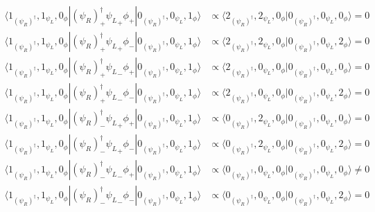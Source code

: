 \begin{align*}
 \langle1_{(\psi_R)^{\dagger}},1_{{\psi_L}},0_{\phi}|(\psi_R)^{\dagger}_{+}{\psi_L}_{+}\phi_{+}|0_{(\psi_R)^{\dagger}},0_{{\psi_L}},1_{\phi}\rangle  &\propto  \langle2_{(\psi_R)^{\dagger}},2_{{\psi_L}},0_{\phi}|0_{(\psi_R)^{\dagger}},0_{{\psi_L}},0_{\phi}\rangle =0\\ 
 \langle1_{(\psi_R)^{\dagger}},1_{{\psi_L}},0_{\phi}|(\psi_R)^{\dagger}_{+}{\psi_L}_{+}\phi_{-}|0_{(\psi_R)^{\dagger}},0_{{\psi_L}},1_{\phi}\rangle  &\propto  \langle2_{(\psi_R)^{\dagger}},2_{{\psi_L}},0_{\phi}|0_{(\psi_R)^{\dagger}},0_{{\psi_L}},2_{\phi}\rangle =0\\ 
 \langle1_{(\psi_R)^{\dagger}},1_{{\psi_L}},0_{\phi}|(\psi_R)^{\dagger}_{+}{\psi_L}_{-}\phi_{+}|0_{(\psi_R)^{\dagger}},0_{{\psi_L}},1_{\phi}\rangle  &\propto  \langle2_{(\psi_R)^{\dagger}},0_{{\psi_L}},0_{\phi}|0_{(\psi_R)^{\dagger}},0_{{\psi_L}},0_{\phi}\rangle =0\\ 
 \langle1_{(\psi_R)^{\dagger}},1_{{\psi_L}},0_{\phi}|(\psi_R)^{\dagger}_{+}{\psi_L}_{-}\phi_{-}|0_{(\psi_R)^{\dagger}},0_{{\psi_L}},1_{\phi}\rangle  &\propto  \langle2_{(\psi_R)^{\dagger}},0_{{\psi_L}},0_{\phi}|0_{(\psi_R)^{\dagger}},0_{{\psi_L}},2_{\phi}\rangle =0\\ 
 \langle1_{(\psi_R)^{\dagger}},1_{{\psi_L}},0_{\phi}|(\psi_R)^{\dagger}_{-}{\psi_L}_{+}\phi_{+}|0_{(\psi_R)^{\dagger}},0_{{\psi_L}},1_{\phi}\rangle  &\propto  \langle0_{(\psi_R)^{\dagger}},2_{{\psi_L}},0_{\phi}|0_{(\psi_R)^{\dagger}},0_{{\psi_L}},0_{\phi}\rangle =0\\ 
 \langle1_{(\psi_R)^{\dagger}},1_{{\psi_L}},0_{\phi}|(\psi_R)^{\dagger}_{-}{\psi_L}_{+}\phi_{-}|0_{(\psi_R)^{\dagger}},0_{{\psi_L}},1_{\phi}\rangle  &\propto  \langle0_{(\psi_R)^{\dagger}},2_{{\psi_L}},0_{\phi}|0_{(\psi_R)^{\dagger}},0_{{\psi_L}},2_{\phi}\rangle =0\\ 
 \langle1_{(\psi_R)^{\dagger}},1_{{\psi_L}},0_{\phi}|(\psi_R)^{\dagger}_{-}{\psi_L}_{-}\phi_{+}|0_{(\psi_R)^{\dagger}},0_{{\psi_L}},1_{\phi}\rangle  &\propto  \langle0_{(\psi_R)^{\dagger}},0_{{\psi_L}},0_{\phi}|0_{(\psi_R)^{\dagger}},0_{{\psi_L}},0_{\phi}\rangle \neq 0\\
 \langle1_{(\psi_R)^{\dagger}},1_{{\psi_L}},0_{\phi}|(\psi_R)^{\dagger}_{-}{\psi_L}_{-}\phi_{-}|0_{(\psi_R)^{\dagger}},0_{{\psi_L}},1_{\phi}\rangle  &\propto  \langle0_{(\psi_R)^{\dagger}},0_{{\psi_L}},0_{\phi}|0_{(\psi_R)^{\dagger}},0_{{\psi_L}},2_{\phi}\rangle =0
\end{align*}
